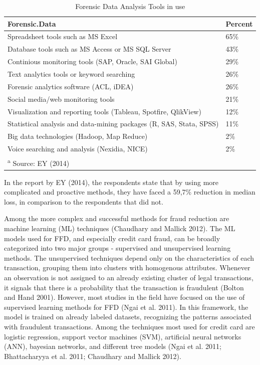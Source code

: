 \documentclass[12pt,]{article}
\begin{document}
\begin{table}

\caption{\label{tab:table analytics}Forensic Data Analysis Tools in use}
\centering
\fontsize{8}{10}\selectfont
\begin{tabular}[t]{ll}
\toprule
Forensic.Data & Percent\\
\midrule
Spreadsheet tools such as MS Excel & 65\%\\
Database tools such as MS Access or MS SQL Server & 43\%\\
Continious monitoring tools  (SAP, Oracle, SAI Global) & 29\%\\
Text analytics tools or keyword searching & 26\%\\
Forensic analytics software (ACL, iDEA) & 26\%\\
\addlinespace
Social media/web monitoring tools & 21\%\\
Visualization and reporting tools (Tableau, Spotfire,                                                     QlikView) & 12\%\\
Statistical analysis and data-mining packages (R,                                                        SAS, Stata, SPSS) & 11\%\\
Big data technologies (Hadoop, Map Reduce) & 2\%\\
Voice searching and analysis (Nexidia, NICE) & 2\%\\
\bottomrule
\multicolumn{2}{l}{\textsuperscript{a} Source: EY (2014)}\\
\end{tabular}
\end{table}

In the report by EY (2014), the respondents state that by using more
complicated and proactive methods, they have faced a 59,7\% reduction in
median loss, in comparison to the respondents that did not.

Among the more complex and successful methods for fraud reduction are
machine learning (ML) techniques (Chaudhary and Mallick 2012). The ML
models used for FFD, and especially credit card fraud, can be broadly
categorized into two major groups - supervised and unsupervised learning
methods. The unsupervised techniques depend only on the characteristics
of each transaction, grouping them into clusters with homogenous
attributes. Whenever an observation is not assigned to an already
existing cluster of legal transactions, it signals that there is a
probability that the transaction is fraudulent (Bolton and Hand 2001).
However, most studies in the field have focused on the use of supervised
learning methods for FFD (Ngai et al. 2011). In this framework, the
model is trained on already labeled datasets, recognizing the patterns
associated with fraudulent transactions. Among the techniques most used
for credit card are logistic regression, support vector machines (SVM),
artificial neural networks (ANN), bayesian networks, and different tree
models (Ngai et al. 2011; Bhattacharyya et al. 2011; Chaudhary and
Mallick 2012).
\end{document}
